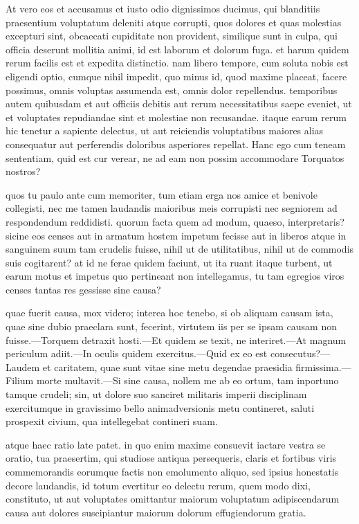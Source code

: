  At vero eos et accusamus et iusto odio dignissimos ducimus, qui blanditiis praesentium voluptatum deleniti atque corrupti, quos dolores et quas molestias excepturi sint, obcaecati cupiditate non provident, similique sunt in culpa, qui officia deserunt mollitia animi, id est laborum et dolorum fuga. et harum quidem rerum facilis est et expedita distinctio. nam libero tempore, cum soluta nobis est eligendi optio, cumque nihil impedit, quo minus id, quod maxime placeat, facere possimus, omnis voluptas assumenda est, omnis dolor repellendus. temporibus autem quibusdam et aut officiis debitis aut rerum necessitatibus saepe eveniet, ut et voluptates repudiandae sint et molestiae non recusandae. itaque earum rerum hic tenetur a sapiente delectus, ut aut reiciendis voluptatibus maiores alias consequatur aut perferendis doloribus asperiores repellat. Hanc ego cum teneam sententiam, quid est cur verear, ne ad eam non possim accommodare Torquatos nostros?

 quos tu paulo ante cum memoriter, tum etiam erga nos amice et benivole collegisti, nec me tamen laudandis maioribus meis corrupisti nec segniorem ad respondendum reddidisti. quorum facta quem ad modum, quaeso, interpretaris? sicine eos censes aut in armatum hostem impetum fecisse aut in liberos atque in sanguinem suum tam crudelis fuisse, nihil ut de utilitatibus, nihil ut de commodis suis cogitarent? at id ne ferae quidem faciunt, ut ita ruant itaque turbent, ut earum motus et impetus quo pertineant non intellegamus, tu tam egregios viros censes tantas res gessisse sine causa?

 quae fuerit causa, mox videro; interea hoc tenebo, si ob aliquam causam ista, quae sine dubio praeclara sunt, fecerint, virtutem iis per se ipsam causam non fuisse.—Torquem detraxit hosti.—Et quidem se texit, ne interiret.—At magnum periculum adiit.—In oculis quidem exercitus.—Quid ex eo est consecutus?—Laudem et caritatem, quae sunt vitae sine metu degendae praesidia firmissima.—Filium morte multavit.—Si sine causa, nollem me ab eo ortum, tam inportuno tamque crudeli; sin, ut dolore suo sanciret militaris imperii disciplinam exercitumque in gravissimo bello animadversionis metu contineret, saluti prospexit civium, qua intellegebat contineri suam.

 atque haec ratio late patet. in quo enim maxime consuevit iactare vestra se oratio, tua praesertim, qui studiose antiqua persequeris, claris et fortibus viris commemorandis eorumque factis non emolumento aliquo, sed ipsius honestatis decore laudandis, id totum evertitur eo delectu rerum, quem modo dixi, constituto, ut aut voluptates omittantur maiorum voluptatum adipiscendarum causa aut dolores suscipiantur maiorum dolorum effugiendorum gratia.

